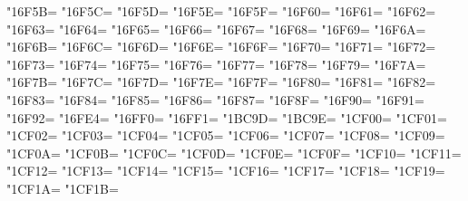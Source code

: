 \XeTeXcharclass"16F5B=\KclassCM
\XeTeXcharclass"16F5C=\KclassCM
\XeTeXcharclass"16F5D=\KclassCM
\XeTeXcharclass"16F5E=\KclassCM
\XeTeXcharclass"16F5F=\KclassCM
\XeTeXcharclass"16F60=\KclassCM
\XeTeXcharclass"16F61=\KclassCM
\XeTeXcharclass"16F62=\KclassCM
\XeTeXcharclass"16F63=\KclassCM
\XeTeXcharclass"16F64=\KclassCM
\XeTeXcharclass"16F65=\KclassCM
\XeTeXcharclass"16F66=\KclassCM
\XeTeXcharclass"16F67=\KclassCM
\XeTeXcharclass"16F68=\KclassCM
\XeTeXcharclass"16F69=\KclassCM
\XeTeXcharclass"16F6A=\KclassCM
\XeTeXcharclass"16F6B=\KclassCM
\XeTeXcharclass"16F6C=\KclassCM
\XeTeXcharclass"16F6D=\KclassCM
\XeTeXcharclass"16F6E=\KclassCM
\XeTeXcharclass"16F6F=\KclassCM
\XeTeXcharclass"16F70=\KclassCM
\XeTeXcharclass"16F71=\KclassCM
\XeTeXcharclass"16F72=\KclassCM
\XeTeXcharclass"16F73=\KclassCM
\XeTeXcharclass"16F74=\KclassCM
\XeTeXcharclass"16F75=\KclassCM
\XeTeXcharclass"16F76=\KclassCM
\XeTeXcharclass"16F77=\KclassCM
\XeTeXcharclass"16F78=\KclassCM
\XeTeXcharclass"16F79=\KclassCM
\XeTeXcharclass"16F7A=\KclassCM
\XeTeXcharclass"16F7B=\KclassCM
\XeTeXcharclass"16F7C=\KclassCM
\XeTeXcharclass"16F7D=\KclassCM
\XeTeXcharclass"16F7E=\KclassCM
\XeTeXcharclass"16F7F=\KclassCM
\XeTeXcharclass"16F80=\KclassCM
\XeTeXcharclass"16F81=\KclassCM
\XeTeXcharclass"16F82=\KclassCM
\XeTeXcharclass"16F83=\KclassCM
\XeTeXcharclass"16F84=\KclassCM
\XeTeXcharclass"16F85=\KclassCM
\XeTeXcharclass"16F86=\KclassCM
\XeTeXcharclass"16F87=\KclassCM
\XeTeXcharclass"16F8F=\KclassCM
\XeTeXcharclass"16F90=\KclassCM
\XeTeXcharclass"16F91=\KclassCM
\XeTeXcharclass"16F92=\KclassCM
\XeTeXcharclass"16FE4=\KclassCM
\XeTeXcharclass"16FF0=\KclassCM
\XeTeXcharclass"16FF1=\KclassCM
\XeTeXcharclass"1BC9D=\KclassCM
\XeTeXcharclass"1BC9E=\KclassCM
\XeTeXcharclass"1CF00=\KclassCM
\XeTeXcharclass"1CF01=\KclassCM
\XeTeXcharclass"1CF02=\KclassCM
\XeTeXcharclass"1CF03=\KclassCM
\XeTeXcharclass"1CF04=\KclassCM
\XeTeXcharclass"1CF05=\KclassCM
\XeTeXcharclass"1CF06=\KclassCM
\XeTeXcharclass"1CF07=\KclassCM
\XeTeXcharclass"1CF08=\KclassCM
\XeTeXcharclass"1CF09=\KclassCM
\XeTeXcharclass"1CF0A=\KclassCM
\XeTeXcharclass"1CF0B=\KclassCM
\XeTeXcharclass"1CF0C=\KclassCM
\XeTeXcharclass"1CF0D=\KclassCM
\XeTeXcharclass"1CF0E=\KclassCM
\XeTeXcharclass"1CF0F=\KclassCM
\XeTeXcharclass"1CF10=\KclassCM
\XeTeXcharclass"1CF11=\KclassCM
\XeTeXcharclass"1CF12=\KclassCM
\XeTeXcharclass"1CF13=\KclassCM
\XeTeXcharclass"1CF14=\KclassCM
\XeTeXcharclass"1CF15=\KclassCM
\XeTeXcharclass"1CF16=\KclassCM
\XeTeXcharclass"1CF17=\KclassCM
\XeTeXcharclass"1CF18=\KclassCM
\XeTeXcharclass"1CF19=\KclassCM
\XeTeXcharclass"1CF1A=\KclassCM
\XeTeXcharclass"1CF1B=\KclassCM
